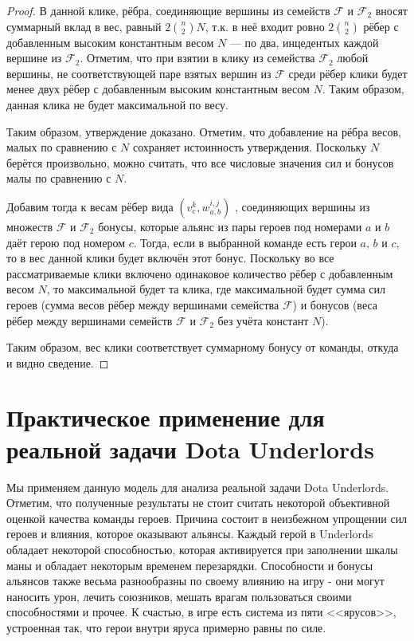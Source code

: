 \documentclass{article}
\begin{document}
\begin{proof}
    В данной клике, рёбра, соединяющие вершины из семейств $\mathcal{F}$ и $\mathcal{F}_2$ вносят суммарный вклад в вес, равный $2 \binom{n}{2} N$, т.к. в неё входит ровно $2 \binom{n}{2}$ рёбер с добавленным высоким константным весом $N$ --- по два, инцедентых каждой вершине из $\mathcal{F}_2$. Отметим, что при взятии в клику из семейства $\mathcal{F}_2$ любой вершины, не соответствующей паре взятых вершин из $\mathcal{F}$ среди рёбер клики будет менее двух рёбер с добавленным высоким константным весом $N$. Таким образом, данная клика не будет максимальной по весу.
    
Таким образом, утверждение доказано. Отметим, что добавление на рёбра весов, малых по сравнению с $N$ сохраняет истоинность утверждения. Поскольку $N$ берётся произвольно, можно считать, что все числовые значения сил и бонусов малы по сравнению с $N$.

Добавим тогда к весам рёбер вида  $(v_c^{k}, w_{a,b}^{i,j} )$ , соединяющих вершины из множеств 
$\mathcal{F}$ и $\mathcal{F}_2$ бонусы, которые альянс из пары героев под номерами $a$ и $b$ даёт герою под номером $c$. Тогда, если в выбранной команде есть герои $a$, $b$ и $c$, то в вес данной клики будет включён этот бонус. Поскольку во все рассматриваемые клики включено одинаковое количество рёбер с добавленным весом $N$, то максимальной будет та клика, где максимальной будет сумма сил героев (сумма весов рёбер между вершинами семейства $\mathcal{F}$) и бонусов (веса рёбер между вершинами семейств $\mathcal{F}$ и $\mathcal{F}_2$ без учёта констант $N$).
    
Таким образом, вес клики соответствует суммарному бонусу от команды, откуда и видно сведение.
    
\end{proof}







\section{Практическое применение для реальной задачи Dota Underlords}
  
Мы применяем данную модель для анализа реальной задачи Dota Underlords. Отметим, что полученные результаты не стоит считать некоторой объективной оценкой качества команды героев. Причина состоит в неизбежном упрощении сил героев и влияния, которое оказывают альянсы. Каждый герой в Underlords обладает некоторой способностью, которая активируется при заполнении шкалы маны и обладает некоторым временем перезарядки. Способности и бонусы альянсов также весьма разнообразны по своему влиянию на игру - они могут наносить урон, лечить союзников, мешать врагам пользоваться своими способностями и прочее. К счастью, в игре есть система из пяти <<ярусов>>, устроенная так, что герои внутри яруса примерно равны по силе.
\end{document}
